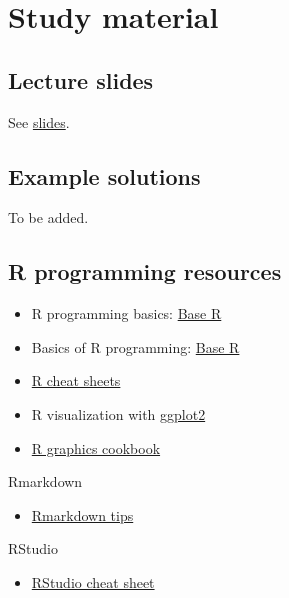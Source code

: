 \documentclass[
  oneside]{book}
\providecommand{\tightlist}{%
  \setlength{\itemsep}{0pt}\setlength{\parskip}{0pt}}
\begin{document}
\hypertarget{study-material}{%
\chapter{Study material}\label{study-material}}

\hypertarget{lecture-slides}{%
\section{Lecture slides}\label{lecture-slides}}

See \href{https://github.com/microbiome/course_2021_radboud/tree/main/slides}{slides}.

\hypertarget{example-solutions-1}{%
\section{Example solutions}\label{example-solutions-1}}

To be added.

\hypertarget{r-programming-resources}{%
\section{R programming resources}\label{r-programming-resources}}

\begin{itemize}
\tightlist
\item
  R programming basics: \href{https://www.rstudio.com/wp-content/uploads/2016/10/r-cheat-sheet-3.pdf}{Base R}
\item
  Basics of R programming: \href{https://raw.githubusercontent.com/rstudio/cheatsheets/master/base-r.pdf}{Base R}
\item
  \href{https://www.rstudio.com/resources/cheatsheets/}{R cheat sheets}
\item
  R visualization with \href{https://www.rstudio.com/wp-content/uploads/2016/11/ggplot2-cheatsheet-2.1.pdf}{ggplot2}
\item
  \href{http://www.cookbook-r.com/Graphs/}{R graphics cookbook}
\end{itemize}

Rmarkdown

\begin{itemize}
\tightlist
\item
  \href{https://rmarkdown.rstudio.com/}{Rmarkdown tips}
\end{itemize}

RStudio

\begin{itemize}
\tightlist
\item
  \href{https://www.rstudio.com/wp-content/uploads/2016/01/rstudio-IDE-cheatsheet.pdf}{RStudio cheat sheet}
\end{itemize}
\end{document}
